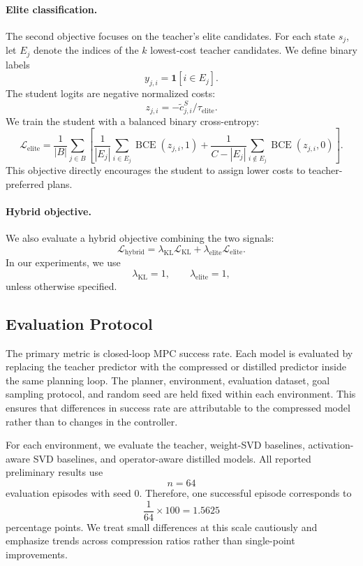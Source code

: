 \documentclass[11pt]{article}
\begin{document}
\paragraph{Elite classification.}
The second objective focuses on the teacher's elite candidates. For each state $s_j$, let $E_j$ denote the indices of the $k$ lowest-cost teacher candidates. We define binary labels
\[
    y_{j,i}
    =
    \mathbf{1}[i \in E_j].
\]
The student logits are negative normalized costs:
\[
    z_{j,i}
    =
    -\tilde c_{j,i}^{S}/\tau_{\mathrm{elite}}.
\]
We train the student with a balanced binary cross-entropy:
\[
    \mathcal{L}_{\mathrm{elite}}
    =
    \frac{1}{|B|}
    \sum_{j \in B}
    \left[
    \frac{1}{|E_j|}
    \sum_{i \in E_j}
    \operatorname{BCE}(z_{j,i},1)
    +
    \frac{1}{C-|E_j|}
    \sum_{i \notin E_j}
    \operatorname{BCE}(z_{j,i},0)
    \right].
\]
This objective directly encourages the student to assign lower costs to teacher-preferred plans.

\paragraph{Hybrid objective.}
We also evaluate a hybrid objective combining the two signals:
\[
    \mathcal{L}_{\mathrm{hybrid}}
    =
    \lambda_{\mathrm{KL}}\mathcal{L}_{\mathrm{KL}}
    +
    \lambda_{\mathrm{elite}}\mathcal{L}_{\mathrm{elite}}.
\]
In our experiments, we use
\[
    \lambda_{\mathrm{KL}} = 1,
    \qquad
    \lambda_{\mathrm{elite}} = 1,
\]
unless otherwise specified.

\subsection{Evaluation Protocol}
\label{sec:evaluation_protocol}

The primary metric is closed-loop MPC success rate. Each model is evaluated by replacing the teacher predictor with the compressed or distilled predictor inside the same planning loop. The planner, environment, evaluation dataset, goal sampling protocol, and random seed are held fixed within each environment. This ensures that differences in success rate are attributable to the compressed model rather than to changes in the controller.

For each environment, we evaluate the teacher, weight-SVD baselines, activation-aware SVD baselines, and operator-aware distilled models. All reported preliminary results use
\[
    n = 64
\]
evaluation episodes with seed $0$. Therefore, one successful episode corresponds to
\[
    \frac{1}{64} \times 100 = 1.5625
\]
percentage points. We treat small differences at this scale cautiously and emphasize trends across compression ratios rather than single-point improvements.
\end{document}
